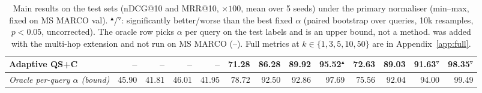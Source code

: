 \begin{table}[t]
{\begin{tabular}{lrrrrrrrrrrrr}
Adaptive \textsc{QS+C} & -- & -- & -- & -- & 71.28 & 86.28 & 89.92 & 95.52$^{\blacktriangle}$ & 72.63 & 89.03 & 91.63$^{\triangledown}$ & 98.35$^{\triangledown}$ \\
\midrule
\textit{Oracle per-query $\alpha$ (bound)} & 45.90 & 41.81 & 46.01 & 41.95 & 78.72 & 92.50 & 92.86 & 97.69 & 75.56 & 92.04 & 94.00 & 99.49 \\
\bottomrule
\end{tabular}}
\caption{Main results on the test sets (nDCG@10 and MRR@10, $\times 100$, mean over 5 seeds) under the primary normaliser (min--max, fixed on MS MARCO val). $^{\blacktriangle}$/$^{\triangledown}$: significantly better/worse than the best fixed $\alpha$ (paired bootstrap over queries, 10k resamples, $p<0.05$, uncorrected). The oracle row picks $\alpha$ per query on the test labels and is an upper bound, not a method.  was added with the multi-hop extension and not run on MS MARCO (--). Full metrics at $k\in\{1,3,5,10,50\}$ are in Appendix~\ref{app:full}.}
\label{tab:main}
\end{table}
